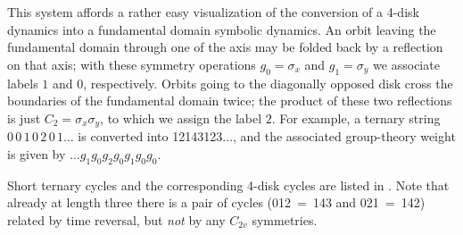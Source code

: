 This system affords a rather easy visualization of the  conversion of a 4-disk
dynamics into a fundamental domain symbolic dynamics. An orbit leaving the
fundamental domain through one of the axis may be folded back by a
reflection on that axis; with these symmetry operations
$g_0 = \sigma_x$ and $g_1 = \sigma_y$ we associate labels $1$ and $0$,
respectively. Orbits going to the diagonally opposed disk cross the
boundaries of the fundamental domain twice; the product of these
two reflections is just $C_2=\sigma_x \sigma_y$, to which we assign
the label $2$. For example, a ternary string $0\,0\,1\,0\,2\,0\,1\dots$
is converted into 12143123$\dots$, and the associated group-theory weight is
given by $\dots g_1 g_0 g_2 g_0 g_1 g_0 g_0 $.

Short ternary cycles and the corresponding 4-disk cycles
are listed in .
Note that already at length three there is a pair of
cycles (012~=~143 and 021~=~142) related by time
reversal, but {\em not} by any $C_{2v}$ symmetries.

